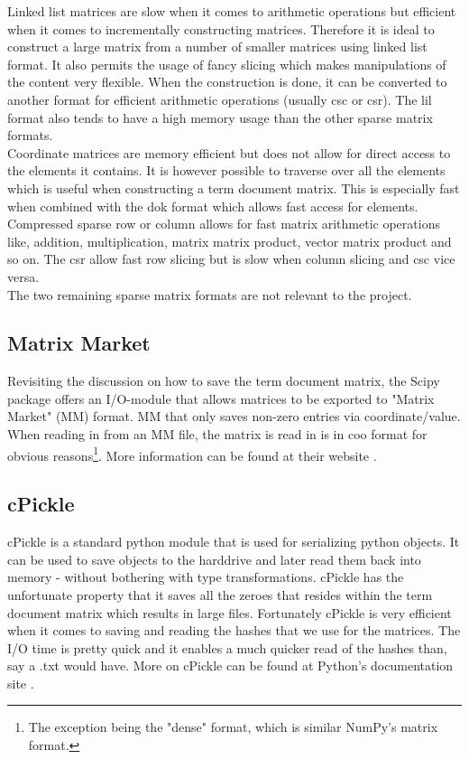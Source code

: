 Linked list matrices are slow when it comes to arithmetic
operations but efficient when it comes to incrementally constructing
matrices. Therefore it is ideal to construct a large matrix from a
number of smaller matrices using linked list format. It also permits
the usage of fancy slicing which makes manipulations of the content
very flexible. When the construction is done, it can be converted to
another format for efficient arithmetic operations (usually csc or
csr). The lil format also tends to have a high memory usage than the
other sparse matrix formats.\\

Coordinate matrices are memory efficient but does not allow for
direct access to the elements it contains. It is however possible to
traverse over all the elements which is useful when constructing a
term document matrix. This is especially fast when combined with the
dok format which allows fast access for elements.\\

Compressed sparse row or column allows for fast matrix
arithmetic operations like, addition, multiplication, matrix matrix
product, vector matrix product and so on. The csr allow fast row
slicing but is slow when column slicing and csc vice versa.\\

The two remaining sparse matrix formats are not relevant to the
project.

\subsection{Matrix Market\label{MatrixMarket}}

Revisiting the discussion on how to save the term document matrix, the
Scipy package \cite{SciPy} offers an I/O-module that allows matrices
to be exported to "Matrix Market" (MM) format. MM that only saves
non-zero entries via coordinate/value. When reading in from an MM
file, the matrix is read in is in coo format for obvious
reasons\footnote{The exception being the "dense" format, which is
  similar NumPy's matrix format.}. More information can be found at
their website \cite{MatrixMarket}.

\subsection{cPickle}

cPickle is a standard python module that is used for serializing
python objects. It can be used to save objects to the harddrive and
later read them back into memory - without bothering with type
transformations. cPickle has the unfortunate property that it saves
all the zeroes that resides within the term document matrix which
results in large files. Fortunately cPickle is very efficient when it
comes to saving and reading the hashes that we use for the
matrices. The I/O time is pretty quick and it enables a much quicker
read of the hashes than, say a .txt would have. More on cPickle
can be found at Python's documentation site \cite{cPicklePython}.

